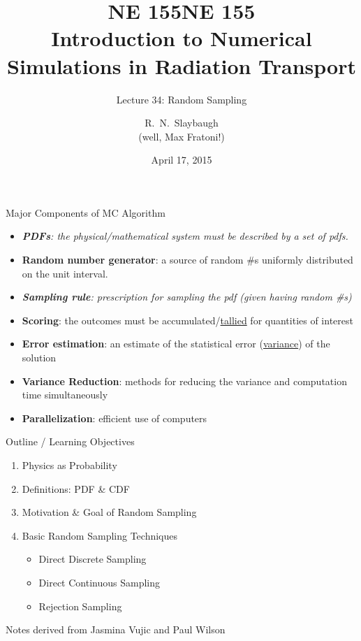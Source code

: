 \documentclass[xcolor=x11names,compress]{beamer}
\title{NE 155}
\author{R.\ N.\ Slaybaugh \\
(well, Max Fratoni!)}
\date{April 17, 2015}
\renewcommand{\(}{\begin{columns}}
\renewcommand{\)}{\end{columns}}
\newcommand{\<}[1]{\begin{column}{#1}}
\renewcommand{\>}{\end{column}}
\begin{document}
\begin{frame}
\title{NE 155\\Introduction to Numerical Simulations in Radiation Transport}
\subtitle{Lecture 34: Random Sampling}
\titlepage
\end{frame}


\begin{frame}{Major Components of MC Algorithm}

\begin{itemize}
  \item \textit{\textbf{PDFs}: the physical/mathematical system must be described by a set of pdfs.}
  \item \textbf{Random number generator}: a source of random \#s uniformly distributed on the unit interval.
  \item \textit{\textbf{Sampling rule}: prescription for sampling the pdf (given having random \#s)}
  \item \textbf{Scoring}: the outcomes must be accumulated/\underline{tallied} for quantities of interest
  \item \textbf{Error estimation}: an estimate of the statistical error (\underline{variance}) of the solution
  \item \textbf{Variance Reduction}: methods for reducing the variance and computation time simultaneously
  \item \textbf{Parallelization}: efficient use of computers
\end{itemize}
\end{frame}


\begin{frame}{Outline / Learning Objectives}

    \begin{enumerate}
    \item Physics as Probability
    \item Definitions: PDF \& CDF
    \item Motivation \& Goal of Random Sampling
    \item Basic Random Sampling Techniques
      \begin{itemize}
        \item Direct Discrete Sampling
        \item Direct Continuous Sampling
        \item Rejection Sampling
      \end{itemize}
    \end{enumerate}

\vspace*{1em}
Notes derived from Jasmina Vujic and Paul Wilson
\end{frame}
\end{document}

